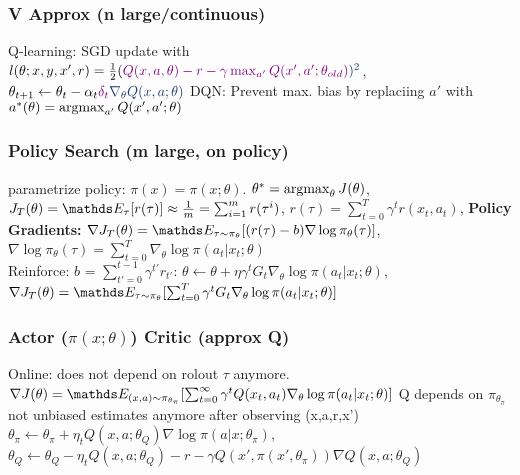 \subsubsection{V Approx (n large/continuous)}
Q-learning: SGD update with $l(\theta; x,y,x',r) = \frac{1}{2}(
\color{violet}Q(x,a,\theta) -r -\gamma \max_{a'}Q(x',a'; \theta_{old})\color{myblue})^2$,
$\theta_{t+1} \leftarrow \theta_{t} - \alpha_{t} \color{violet}\delta_{t} \color{myblue} \nabla_{\theta}Q(x,a;\theta)$
DQN: Prevent max. bias by replaciing $a'$ with $a^*(\theta) = \operatorname*{argmax}_{a'}Q(x',a';\theta)$

\subsubsection{Policy Search (m large, on policy)}
parametrize policy: $\pi(x)= \pi(x;\theta)$. $\theta^* =\operatorname*{argmax}_{\theta}J(\theta)$,
$J_T(\theta)=\E[\tau]{r(\tau)} \approx \frac{1}{m} = \sum_{i=1}^{m}r(\tau^{i})$,
$r(\tau) = \sum_{t=0}^{T}\gamma^t r(x_t, a_t)$,
\textbf{Policy Gradients:}
$\nabla J_T(\theta) = \E[\tau \sim \pi_{\theta}]{(r(\tau) - b) \nabla \log \pi_{\theta}(\tau)}$,
$\nabla \log \pi_{\theta}(\tau) = \sum_{t=0}^{T} \nabla_{\theta}
\log \pi(a_t|x_t; \theta)$\\
Reinforce: $b$ = $\sum_{t'=0}^{t-1} \gamma^{t'}r_{t'}$:
$\theta \leftarrow \theta + \eta \gamma^t G_t \nabla_{\theta} \log \pi(a_t|x_t; \theta)$,
$\nabla J_T(\theta) = \E[\tau \sim \pi_{\theta}]{\sum_{t=0}^{T}\gamma^t G_t \nabla_{\theta} \log \pi(a_t|x_t; \theta)}$

\subsubsection{Actor ($\pi(x; \theta)$) Critic (approx Q)}
Online: does not depend on rolout $\tau$ anymore.
$\nabla J(\theta) = \E[(x,a) \sim \pi_{\theta_\pi}]{\sum_{t=0}^{\infty}\gamma^t Q(x_t, a_t)
    \nabla_{\theta} \log \pi(a_t|x_t; \theta)}$
Q depends on $\pi_{\theta_\pi}$ \textrightarrow not unbiased estimates anymore
after observing (x,a,r,x')
$\theta_\pi \leftarrow \theta_\pi + \eta_t Q(x,a;\theta_Q) \nabla \log \pi(a|x; \theta_{\pi})$,
$\theta_{Q} \leftarrow \theta_{Q} - \eta_t Q(x,a;\theta_Q) -r - \gamma Q(x', \pi(x', \theta_{\pi})) \nabla Q(x,a;\theta_Q)$





